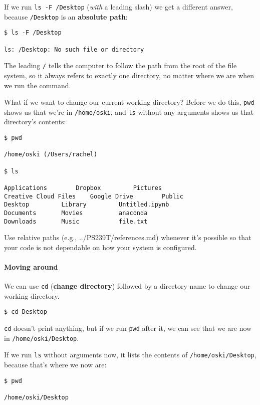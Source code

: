 \documentclass[
]{book}
\begin{document}
If we run \texttt{ls\ -F\ /Desktop} (\emph{with} a leading slash) we get a different answer, because \texttt{/Desktop} is an \textbf{absolute path}:

\begin{verbatim}
$ ls -F /Desktop

ls: /Desktop: No such file or directory
\end{verbatim}

The leading \texttt{/} tells the computer to follow the path from the root of the file system, so it always refers to exactly one directory, no matter where we are when we run the command.

What if we want to change our current working directory? Before we do this, \texttt{pwd} shows us that we're in \texttt{/home/oski}, and \texttt{ls} without any arguments shows us that directory's contents:

\begin{verbatim}
$ pwd

/home/oski (/Users/rachel)

$ ls

Applications        Dropbox         Pictures
Creative Cloud Files    Google Drive        Public
Desktop         Library         Untitled.ipynb
Documents       Movies          anaconda
Downloads       Music           file.txt
\end{verbatim}

Use relative paths (e.g., ../PS239T/references.md) whenever it's possible so that your code is not dependable on how your system is configured.

\hypertarget{moving-around}{%
\paragraph{Moving around}\label{moving-around}}

We can use \texttt{cd} (\textbf{change directory}) followed by a directory name to change our working directory.

\begin{verbatim}
$ cd Desktop
\end{verbatim}

\texttt{cd} doesn't print anything, but if we run \texttt{pwd} after it, we can see that we are now in \texttt{/home/oski/Desktop}.

If we run \texttt{ls} without arguments now, it lists the contents of \texttt{/home/oski/Desktop}, because that's where we now are:

\begin{verbatim}
$ pwd

/home/oski/Desktop
\end{verbatim}
\end{document}
